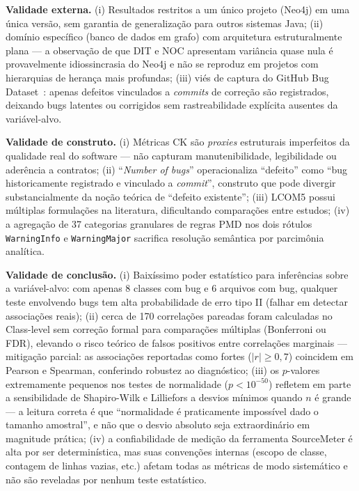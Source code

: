 \documentclass[12pt]{article}
\begin{document}
\textbf{Validade externa.} (i) Resultados restritos a um único projeto (Neo4j) em uma única versão, sem garantia de generalização para outros sistemas Java; (ii) domínio específico (banco de dados em grafo) com arquitetura estruturalmente plana --- a observação de que DIT e NOC apresentam variância quase nula é provavelmente idiossincrasia do Neo4j e não se reproduz em projetos com hierarquias de herança mais profundas; (iii) viés de captura do GitHub Bug Dataset~\cite{toth2016}: apenas defeitos vinculados a \textit{commits} de correção são registrados, deixando bugs latentes ou corrigidos sem rastreabilidade explícita ausentes da variável-alvo.

\textbf{Validade de construto.} (i) Métricas CK são \textit{proxies} estruturais imperfeitos da qualidade real do software --- não capturam manutenibilidade, legibilidade ou aderência a contratos; (ii) ``\textit{Number of bugs}'' operacionaliza ``defeito'' como ``bug historicamente registrado e vinculado a \textit{commit}'', construto que pode divergir substancialmente da noção teórica de ``defeito existente''; (iii) LCOM5 possui múltiplas formulações na literatura, dificultando comparações entre estudos; (iv) a agregação de 37 categorias granulares de regras PMD nos dois rótulos \texttt{WarningInfo} e \texttt{WarningMajor} sacrifica resolução semântica por parcimônia analítica.

\textbf{Validade de conclusão.} (i) Baixíssimo poder estatístico para inferências sobre a variável-alvo: com apenas 8 classes com bug e 6 arquivos com bug, qualquer teste envolvendo bugs tem alta probabilidade de erro tipo II (falhar em detectar associações reais); (ii) cerca de 170 correlações pareadas foram calculadas no Class-level sem correção formal para comparações múltiplas (Bonferroni ou FDR), elevando o risco teórico de falsos positivos entre correlações marginais --- mitigação parcial: as associações reportadas como fortes ($|r| \geq 0{,}7$) coincidem em Pearson e Spearman, conferindo robustez ao diagnóstico; (iii) os $p$-valores extremamente pequenos nos testes de normalidade ($p < 10^{-50}$) refletem em parte a sensibilidade de Shapiro-Wilk e Lilliefors a desvios mínimos quando $n$ é grande --- a leitura correta é que ``normalidade é praticamente impossível dado o tamanho amostral'', e não que o desvio absoluto seja extraordinário em magnitude prática; (iv) a confiabilidade de medição da ferramenta SourceMeter é alta por ser determinística, mas suas convenções internas (escopo de classe, contagem de linhas vazias, etc.) afetam todas as métricas de modo sistemático e não são reveladas por nenhum teste estatístico.
\end{document}

